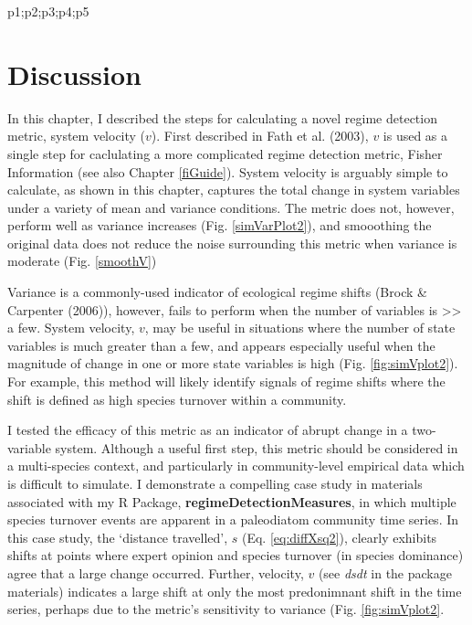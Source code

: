 \documentclass[12pt,twoside,openany]{reedthesis}
\newenvironment{Shaded}{\begin{snugshade}}{\end{snugshade}}
\newcommand{\NormalTok}[1]{#1}
\begin{document}
\begin{Shaded}
\begin{Highlighting}[]
\NormalTok{p1;p2;p3;p4;p5}
\end{Highlighting}
\end{Shaded}
\hypertarget{discussion-3}{%
\section{Discussion}\label{discussion-3}}

In this chapter, I described the steps for calculating a novel regime detection metric, system velocity (\(v\)). First described in Fath et al. (2003), \(v\) is used as a single step for caclulating a more complicated regime detection metric, Fisher Information (see also Chapter \ref{fiGuide}). System velocity is arguably simple to calculate, as shown in this chapter, captures the total change in system variables under a variety of mean and variance conditions. The metric does not, however, perform well as variance increases (Fig. \ref{simVarPlot2}), and smooothing the original data does not reduce the noise surrounding this metric when variance is moderate (Fig. \ref{smoothV})

Variance is a commonly-used indicator of ecological regime shifts (Brock \& Carpenter (2006)), however, fails to perform when the number of variables is \textgreater{}\textgreater{} a few. System velocity, \(v\), may be useful in situations where the number of state variables is much greater than a few, and appears especially useful when the magnitude of change in one or more state variables is high (Fig. \ref{fig:simVplot2}). For example, this method will likely identify signals of regime shifts where the shift is defined as high species turnover within a community.

I tested the efficacy of this metric as an indicator of abrupt change in a two-variable system. Although a useful first step, this metric should be considered in a multi-species context, and particularly in community-level empirical data which is difficult to simulate. I demonstrate a compelling case study in materials associated with my R Package, \textbf{regimeDetectionMeasures}, in which multiple species turnover events are apparent in a paleodiatom community time series. In this case study, the `distance travelled', \(s\) (Eq. \eqref{eq:diffXsq2}), clearly exhibits shifts at points where expert opinion and species turnover (in species dominance) agree that a large change occurred. Further, velocity, \(v\) (see \emph{dsdt} in the package materials) indicates a large shift at only the most predonimnant shift in the time series, perhaps due to the metric's sensitivity to variance (Fig. \ref{fig:simVplot2}.
\end{document}
